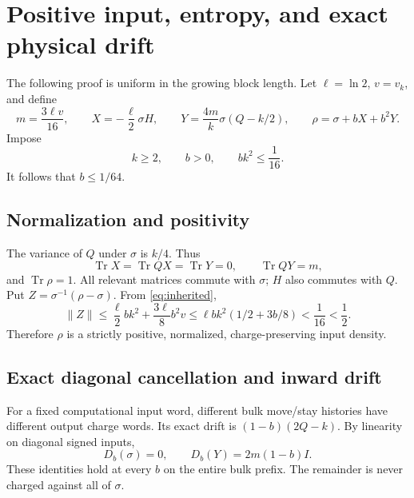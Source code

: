 \documentclass[11pt]{article}
\newcommand{\Tr}{\operatorname{Tr}}
\newcommand{\norm}[1]{\lVert #1\rVert}
\begin{document}
\section{Positive input, entropy, and exact physical drift}

The following proof is uniform in the growing block length.
Let \(\ell=\ln2\), \(v=v_k\), and define
\begin{equation}\label{eq:rho}
 m=\frac{3\ell v}{16},\qquad
 X=-\frac\ell2\sigma H,\qquad
 Y=\frac{4m}{k}\sigma(Q-k/2),\qquad
 \rho=\sigma+bX+b^2Y.
\end{equation}
Impose
\begin{equation}\label{eq:window}
 k\ge2,\qquad b>0,\qquad bk^2\le\frac1{16}.
\end{equation}
It follows that \(b\le1/64\).

\subsection{Normalization and positivity}

The variance of \(Q\) under \(\sigma\) is \(k/4\). Thus
\[
 \Tr X=\Tr QX=\Tr Y=0,\qquad \Tr QY=m,
\]
and \(\Tr\rho=1\). All relevant matrices commute with \(\sigma\);
\(H\) also commutes with \(Q\). Put
\(Z=\sigma^{-1}(\rho-\sigma)\). From \eqref{eq:inherited},
\begin{equation}\label{eq:Z}
 \norm Z
 \le\frac\ell2 bk^2+\frac{3\ell}{8}b^2v
 \le\ell bk^2(1/2+3b/8)<\frac1{16}<\frac12.
\end{equation}
Therefore \(\rho\) is a strictly positive, normalized, charge-preserving
input density.

\subsection{Exact diagonal cancellation and inward drift}

For a fixed computational input word, different bulk move/stay histories
have different output charge words. Its exact drift is
\((1-b)(2Q-k)\). By linearity on diagonal signed inputs,
\begin{equation}\label{eq:diagonal}
 D_b(\sigma)=0,\qquad D_b(Y)=2m(1-b)I.
\end{equation}
These identities hold at every \(b\) on the entire bulk prefix.
The remainder is never charged against all of \(\sigma\).
\end{document}
